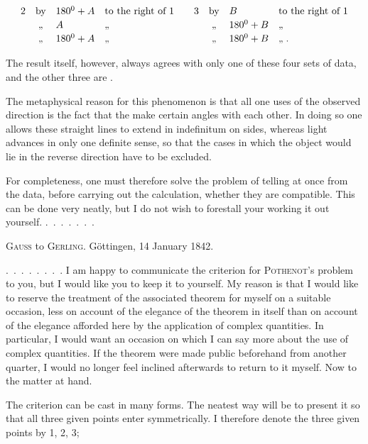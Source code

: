 \[
\begin{array}{rcll@{\qquad}rcll}
2 & \text{by} & 180^0+A & \text{to the right of }1 & 3 & \text{by} & B & \text{to the right of }1\\[2pt]
 & \text{,,} & A & \text{,,} & & \text{,,} & 180^0+B & \text{,,}\\[2pt]
 & \text{,,} & 180^0+A & \text{,,} & & \text{,,} & 180^0+B & \text{,,}\;.
\end{array}
\]

The result itself, however, always agrees with only one of these four sets of data, and the other three are .

The metaphysical reason for this phenomenon is that all one uses of the observed direction is the fact that the  make certain angles with each other. In doing so one allows these straight lines to extend in indefinitum on  sides, whereas light advances in only one definite sense, so that the cases in which the object would lie in the reverse direction have to be excluded.

For completeness, one must therefore solve the problem of telling at once from the data, before carrying out the calculation, whether they are compatible. This can be done very neatly, but I do not wish to forestall your working it out yourself. \mbox{. . . . . . .}



\centerline{\textsc{Gauss} to \textsc{Gerling}. Göttingen, 14 January 1842.}

\indent \mbox{. . . . . . . .} I am happy to communicate the criterion for \textsc{Pothenot}'s problem to you, but I would like you to keep it to yourself. My reason is that I would like to reserve the treatment of the associated theorem for myself on a suitable occasion, less on account of the elegance of the theorem in itself than on account of the elegance afforded here by the application of complex quantities. In particular, I would want an occasion on which I can say more about the use of complex quantities. If the theorem were made public beforehand from another quarter, I would no longer feel inclined afterwards to return to it myself. Now to the matter at hand.

The criterion can be cast in many forms. The neatest way will be to present it so that all three given points enter symmetrically. I therefore denote the three given points by 1, 2, 3;\space%
